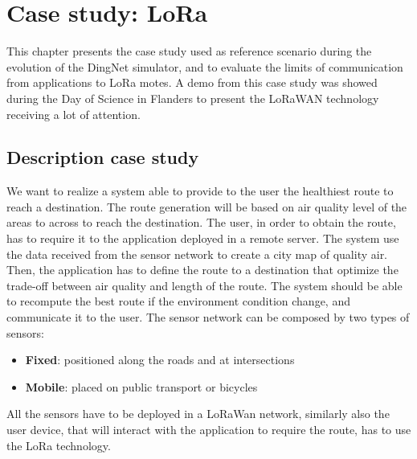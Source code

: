 \chapter{Case study: LoRa}
\label{chap:case-staudyLoRa}

This chapter presents the case study used as reference scenario during the evolution of the DingNet simulator, and to evaluate the limits of communication from applications to LoRa motes. 
A demo from this case study was showed during the Day of Science in Flanders to present the LoRaWAN technology receiving a lot of attention.

\section{Description case study}

We want to realize a system able to provide to the user the healthiest route to reach a destination. 
The route generation will be based on air quality level of the areas to across to reach the destination. 
The user, in order to obtain the route, has to require it to the application deployed in a remote server.
The system use the data received from the sensor network to create a city map of quality air.
Then, the application has to define the route to a destination that optimize the trade-off between air quality and length of the route.
The system should be able to recompute the best route if the environment condition change, and communicate it to the user.
The sensor network can be composed by two types of sensors:
\begin{itemize}
    \item \textbf{Fixed}: positioned along the roads and at intersections
    \item \textbf{Mobile}: placed on public transport or bicycles
\end{itemize}
All the sensors have to be deployed in a LoRaWan network, similarly also the user device, that will interact with the application to require the route, has to use the LoRa technology.

